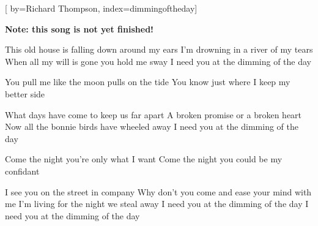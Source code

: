 
[%
    by={Richard Thompson},
    index={dimmingoftheday}]


    \label{dimmingoftheday}

    \textbf{Note: this song is not yet finished!}

    \beginverse
        This old house is falling down around my ears
        I'm drowning in a river of my tears
        When all my will is gone you hold me sway
        I need you at the dimming of the day

        You pull me like the moon pulls on the tide
        You know just where I keep my better side

        What days have come to keep us far apart
        A broken promise or a broken heart
        Now all the bonnie birds have wheeled away
        I need you at the dimming of the day

        Come the night you're only what I want
        Come the night you could be my confidant

        I see you on the street in company
        Why don't you come and ease your mind with me
        I'm living for the night we steal away
        I need you at the dimming of the day
        I need you at the dimming of the day
    \endverse
\endsong
